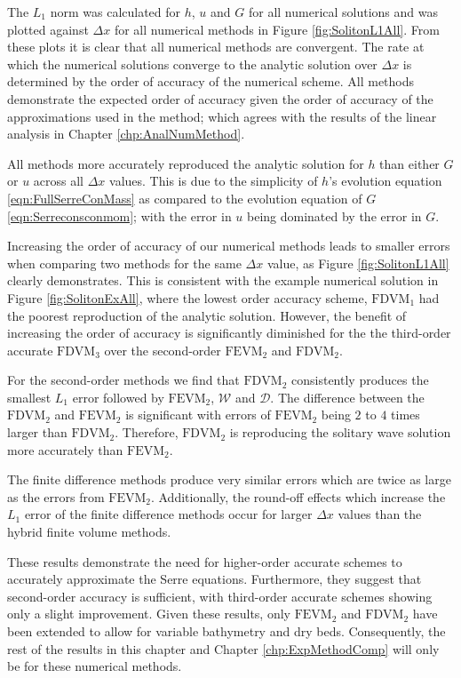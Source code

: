 The $L_1$ norm was calculated for $h$, $u$ and $G$ for all numerical solutions and was plotted against $\Delta x$ for all numerical methods in Figure \ref{fig:SolitonL1All}. From these plots it is clear that all numerical methods are convergent. The rate at which the numerical solutions converge to the analytic solution over $\Delta x$ is determined by the order of accuracy of the numerical scheme. All methods demonstrate the expected order of accuracy given the order of accuracy of the approximations used in the method; which agrees with the results of the linear analysis in Chapter \ref{chp:AnalNumMethod}.  

All methods more accurately reproduced the analytic solution for $h$ than either $G$ or $u$ across all $\Delta x$ values. This is due to the simplicity of $h$'s evolution equation \eqref{eqn:FullSerreConMass} as compared to the evolution equation of $G$ \eqref{eqn:Serreconsconmom}; with the error in $u$ being dominated by the error in $G$. 

Increasing the order of accuracy of our numerical methods leads to smaller errors when comparing two methods for the same $\Delta x$ value, as Figure \ref{fig:SolitonL1All} clearly demonstrates. This is consistent with the example numerical solution in Figure \ref{fig:SolitonExAll}, where the lowest order accuracy scheme, $\text{FDVM}_1$ had the poorest reproduction of the analytic solution. However, the benefit of increasing the order of accuracy is significantly diminished for the the third-order accurate $\text{FDVM}_3$ over the second-order $\text{FEVM}_2$ and $\text{FDVM}_2$.

For the second-order methods we find that $\text{FDVM}_2$ consistently produces the smallest $L_1$ error followed by $\text{FEVM}_2$, $\mathcal{W}$ and $\mathcal{D}$. The difference between the $\text{FDVM}_2$ and $\text{FEVM}_2$ is significant with errors of $\text{FEVM}_2$ being $2$ to $4$ times larger than $\text{FDVM}_2$. Therefore, $\text{FDVM}_2$ is reproducing the solitary wave solution more accurately than $\text{FEVM}_2$.

The finite difference methods produce very similar errors which are twice as large as the errors from $\text{FEVM}_2$. Additionally, the round-off effects which increase the $L_1$ error of the finite difference methods occur for larger $\Delta x$ values than the hybrid finite volume methods.

These results demonstrate the need for higher-order accurate schemes to accurately approximate the Serre equations. Furthermore, they suggest that second-order accuracy is sufficient, with third-order accurate schemes showing only a slight improvement. Given these results, only $\text{FEVM}_2$ and $\text{FDVM}_2$ have been extended to allow for variable bathymetry and dry beds. Consequently, the rest of the results in this chapter and Chapter \ref{chp:ExpMethodComp} will only be for these numerical methods. 


